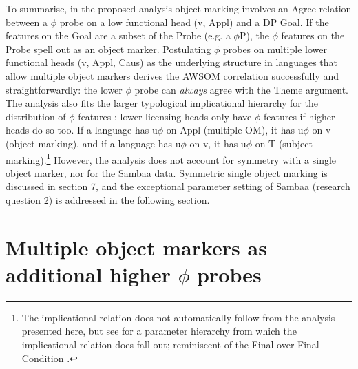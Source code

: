 \documentclass[output=paper
,modfonts
,nonflat]{langsci/langscibook}
\begin{document}
To summarise, in the proposed analysis object marking involves an Agree relation between a $\phi$ probe on a low functional head (v, Appl) and a DP Goal. If the features on the Goal are a subset of the Probe (e.g. a $\phi$P), the $\phi$ features on the Probe spell out as an object marker. Postulating $\phi$ probes on multiple lower functional heads (v, Appl, Caus) as the underlying structure in languages that allow multiple object markers derives the AWSOM correlation successfully and straightforwardly: the lower $\phi$ probe can \textit{always} agree with the Theme argument. The analysis also fits the larger typological implicational hierarchy for the distribution of $\phi$ features \citep{Moravcsik1974, Givón1976}: lower licensing heads only have $\phi$ features if higher heads do so too. If a language has u$\phi$ on Appl (multiple OM), it has u$\phi$ on v (object marking), and if a language has u$\phi$ on v, it has u$\phi$ on T (subject marking).\footnote{The implicational relation does not automatically follow from the analysis presented here, but see \citet{Van_der_WalTA} for a parameter hierarchy from which the implicational relation does fall out; reminiscent of the Final over Final Condition \citep{Sheehan_et_al2017}.} However, the analysis does not account for symmetry with a single object marker, nor for the Sambaa data. Symmetric single object marking is discussed in section 7, and the exceptional parameter setting of Sambaa (research question 2) is addressed in the following section. 

\section{Multiple object markers as additional higher $\phi$ probes}
\end{document}
